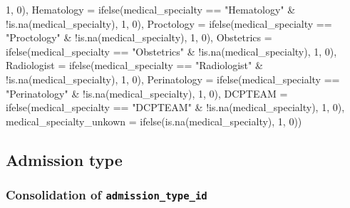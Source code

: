 \documentclass[
]{article}
\newenvironment{Shaded}{\begin{snugshade}}{\end{snugshade}}
\newcommand{\AttributeTok}[1]{\textcolor[rgb]{0.77,0.63,0.00}{#1}}
\newcommand{\DecValTok}[1]{\textcolor[rgb]{0.00,0.00,0.81}{#1}}
\newcommand{\FunctionTok}[1]{\textcolor[rgb]{0.00,0.00,0.00}{#1}}
\newcommand{\NormalTok}[1]{#1}
\newcommand{\SpecialCharTok}[1]{\textcolor[rgb]{0.00,0.00,0.00}{#1}}
\newcommand{\StringTok}[1]{\textcolor[rgb]{0.31,0.60,0.02}{#1}}
\begin{document}
\begin{Shaded}
\begin{Highlighting}[]
            \DecValTok{1}\NormalTok{, }\DecValTok{0}\NormalTok{), }\AttributeTok{Hematology =} \FunctionTok{ifelse}\NormalTok{(medical\_specialty }\SpecialCharTok{==}
            \StringTok{"Hematology"} \SpecialCharTok{\&} \SpecialCharTok{!}\FunctionTok{is.na}\NormalTok{(medical\_specialty),}
            \DecValTok{1}\NormalTok{, }\DecValTok{0}\NormalTok{), }\AttributeTok{Proctology =} \FunctionTok{ifelse}\NormalTok{(medical\_specialty }\SpecialCharTok{==}
            \StringTok{"Proctology"} \SpecialCharTok{\&} \SpecialCharTok{!}\FunctionTok{is.na}\NormalTok{(medical\_specialty),}
            \DecValTok{1}\NormalTok{, }\DecValTok{0}\NormalTok{), }\AttributeTok{Obstetrics =} \FunctionTok{ifelse}\NormalTok{(medical\_specialty }\SpecialCharTok{==}
            \StringTok{"Obstetrics"} \SpecialCharTok{\&} \SpecialCharTok{!}\FunctionTok{is.na}\NormalTok{(medical\_specialty),}
            \DecValTok{1}\NormalTok{, }\DecValTok{0}\NormalTok{), }\AttributeTok{Radiologist =} \FunctionTok{ifelse}\NormalTok{(medical\_specialty }\SpecialCharTok{==}
            \StringTok{"Radiologist"} \SpecialCharTok{\&} \SpecialCharTok{!}\FunctionTok{is.na}\NormalTok{(medical\_specialty),}
            \DecValTok{1}\NormalTok{, }\DecValTok{0}\NormalTok{), }\AttributeTok{Perinatology =} \FunctionTok{ifelse}\NormalTok{(medical\_specialty }\SpecialCharTok{==}
            \StringTok{"Perinatology"} \SpecialCharTok{\&} \SpecialCharTok{!}\FunctionTok{is.na}\NormalTok{(medical\_specialty),}
            \DecValTok{1}\NormalTok{, }\DecValTok{0}\NormalTok{), }\AttributeTok{DCPTEAM =} \FunctionTok{ifelse}\NormalTok{(medical\_specialty }\SpecialCharTok{==}
            \StringTok{"DCPTEAM"} \SpecialCharTok{\&} \SpecialCharTok{!}\FunctionTok{is.na}\NormalTok{(medical\_specialty),}
            \DecValTok{1}\NormalTok{, }\DecValTok{0}\NormalTok{), }\AttributeTok{medical\_specialty\_unkown =} \FunctionTok{ifelse}\NormalTok{(}\FunctionTok{is.na}\NormalTok{(medical\_specialty),}
            \DecValTok{1}\NormalTok{, }\DecValTok{0}\NormalTok{))}
\end{Highlighting}
\end{Shaded}

\hypertarget{admission-type}{%
\subsection{Admission type}\label{admission-type}}

\hypertarget{consolidation-of-admission_type_id}{%
\subsubsection{\texorpdfstring{Consolidation of
\texttt{admission\_type\_id}}{Consolidation of admission\_type\_id}}\label{consolidation-of-admission_type_id}}
\end{document}

